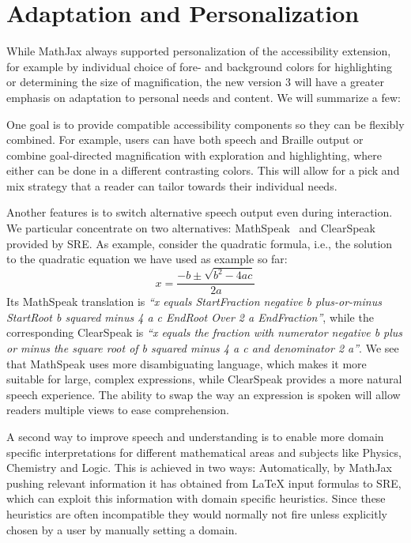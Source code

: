 \documentclass{sig-alternate}
\begin{document}
\section{Adaptation and Personalization}
\label{sec:challenges}

While MathJax always supported personalization of the accessibility extension,
for example by individual choice of fore- and background colors for highlighting or
determining the size of magnification, the new version 3 will have a greater
emphasis on adaptation to personal needs and content. We will summarize a few:

 One goal is to provide compatible accessibility
components so they can be flexibly combined.  For example, users can have both
speech and Braille output or combine goal-directed magnification with
exploration and highlighting, where either can be done in a different
contrasting colors. This will allow for a pick and mix strategy that a reader
can tailor towards their individual needs.

 Another features is to switch alternative speech
output even during interaction. We particular concentrate on two alternatives:
MathSpeak~\cite{MathSpeak} and ClearSpeak~\cite{frankel2016development} provided
by SRE. As example, consider the quadratic formula, i.e., the solution to the
quadratic equation we have used as example so far:
\[x = \frac{-b\pm\sqrt{b^2-4ac}}{2a}\] Its MathSpeak translation is \emph{``x
  equals StartFraction negative b plus-or-minus StartRoot b squared minus 4 a c
  EndRoot Over 2 a EndFraction''}, while the corresponding ClearSpeak is
\emph{``x equals the fraction with numerator negative b plus or minus the square
  root of b squared minus 4 a c and denominator 2 a''}.  We see that MathSpeak
uses more disambiguating language, which makes it more suitable for large,
complex expressions, while ClearSpeak provides a more natural speech experience.
The ability to swap the way an expression is spoken will allow readers multiple
views to ease comprehension.

 A second way to improve speech and
understanding is to enable more domain specific interpretations for different
mathematical areas and subjects like Physics, Chemistry and Logic. This is
achieved in two ways: Automatically, by MathJax pushing relevant information it
has obtained from {\LaTeX} input formulas to SRE, which can exploit this
information with domain specific heuristics. Since these heuristics are often
incompatible they would normally not fire unless explicitly chosen by a user by
manually setting a domain.
\end{document}
